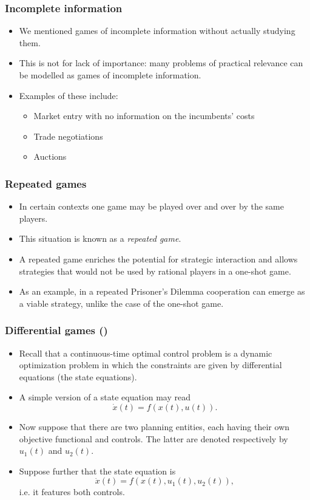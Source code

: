 \documentclass[10pt]{beamer}
\theoremstyle{definition}
\begin{document}
\begin{frame}[fragile]
\frametitle{Incomplete information}
\begin{itemize}\itemsep1em
\item We mentioned games of incomplete information without actually studying them.
\item This is not for lack of importance: many problems of practical relevance can be modelled as games of incomplete information.
\item Examples of these include:
	\begin{itemize}\itemsep1em
	\item Market entry with no information on the incumbents' costs
	\item Trade negotiations
	\item Auctions
	\end{itemize}
\end{itemize}
\end{frame}


\begin{frame}[fragile]
\frametitle{Repeated games}
\begin{itemize}\itemsep1em
\item In certain contexts one game may be played over and over by the same players.
\item This situation is known as a \emph{repeated game}.
\item A repeated game enriches the potential for strategic interaction and allows strategies that would not be used by rational players in a one-shot game.
\item As an example, in a repeated Prisoner's Dilemma cooperation can emerge as a viable strategy, unlike the case of the one-shot game.
\end{itemize}
\end{frame}

\begin{frame}[fragile]\setcounter{slidenum}{1}
\frametitle{Differential games ()}
\begin{itemize}\itemsep1em
\item Recall that a continuous-time optimal control problem is a dynamic optimization problem in which the constraints are given by differential equations (the state equations). 
\item A simple version of a state equation may read \[ \dot{x}(t) = f(x(t),u(t)). \]
\item Now suppose that there are two planning entities, each having their own objective functional and controls. The latter are denoted respectively by $ u_1(t) $ and $ u_2(t) $.
\item Suppose further that the state equation is \[ \dot{x}(t) = f(x(t),u_1(t),u_2(t)), \]
i.e. it features both controls.
\end{itemize}
\end{frame}
\end{document}
